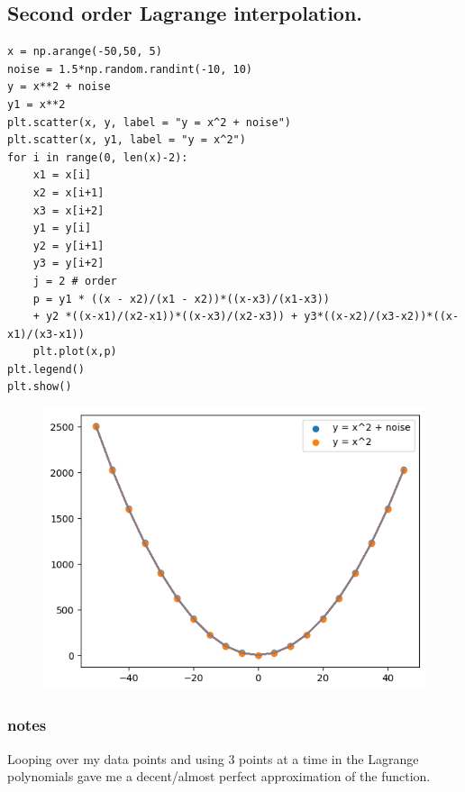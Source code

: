 \documentclass{article}
\begin{document}
\subsection{Second order Lagrange interpolation.}
\begin{verbatim}
x = np.arange(-50,50, 5)
noise = 1.5*np.random.randint(-10, 10)
y = x**2 + noise
y1 = x**2
plt.scatter(x, y, label = "y = x^2 + noise")
plt.scatter(x, y1, label = "y = x^2")
for i in range(0, len(x)-2):
    x1 = x[i]
    x2 = x[i+1]
    x3 = x[i+2]
    y1 = y[i]
    y2 = y[i+1] 
    y3 = y[i+2]
    j = 2 # order
    p = y1 * ((x - x2)/(x1 - x2))*((x-x3)/(x1-x3))
    + y2 *((x-x1)/(x2-x1))*((x-x3)/(x2-x3)) + y3*((x-x2)/(x3-x2))*((x-x1)/(x3-x1))
    plt.plot(x,p)
plt.legend()
plt.show()
\end{verbatim}
\begin{figure}[H]
    \centering
\includegraphics[scale = 0.8]{2ndOrderLagrange.png}
\end{figure}
\subsubsection*{notes} Looping over my data points and using 3 points at a time in the Lagrange polynomials gave me a decent/almost perfect approximation of the function.
\end{document}

